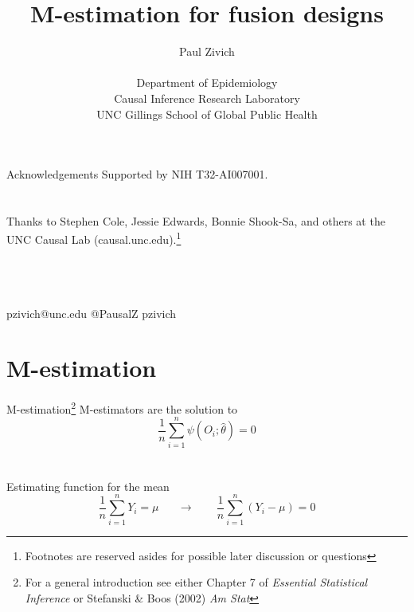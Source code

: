\documentclass{beamer}
\title{M-estimation for fusion designs}
\author[Paul Zivich]{Paul Zivich \\~\\ Department of Epidemiology \\ Causal Inference Research Laboratory \\ UNC Gillings School of Global Public Health}
\begin{document}
	\begin{frame}[plain]
		\maketitle
\end{frame}

\begin{frame}{Acknowledgements}
	Supported by NIH T32-AI007001.\\~\\~\\
	
	Thanks to Stephen Cole, Jessie Edwards, Bonnie Shook-Sa, and others at the UNC Causal Lab (causal.unc.edu).\footnote[frame]{Footnotes are reserved asides for possible later discussion or questions}\\~\\~\\~\\
	\begin{center}
		\faEnvelope \quad pzivich@unc.edu \qquad
		\faTwitter \quad @PausalZ \qquad
		\faGithub \quad pzivich\\
	\end{center}
\end{frame}

\section{M-estimation}

\begin{frame}{M-estimation\footnote[frame]{For a general introduction see either Chapter 7 of \textit{Essential Statistical Inference} or Stefanski \& Boos (2002) \textit{Am Stat}}}
	M-estimators are the solution to
	\[\frac{1}{n} \sum_{i=1}^{n} \psi(O_i; \hat{\theta}) = 0\]~\\~\\
	Estimating function for the mean
	\[\frac{1}{n} \sum_{i=1}^{n} Y_i = \mu \;\;\;\;\;\; \rightarrow \;\;\;\;\;\;\; \frac{1}{n} \sum_{i=1}^{n} (Y_i - \mu) = 0\]
\end{frame}

\end{document}
